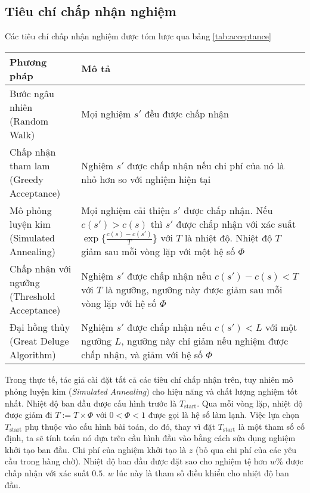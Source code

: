 \subsection{Tiêu chí chấp nhận nghiệm}

Các tiêu chí chấp nhận nghiệm được tóm lược qua bảng \ref{tab:acceptance}

\begin{table}[caption={Tiêu chí chấp nhận nghiệm}, label=tab:acceptance]
  \begin{tabularx}{\textwidth}{|l|X|}
    \hline
    Phương pháp & Mô tả \\ \hline
    \makecell[l]{Bước ngâu nhiên \\ (Random Walk)} & Mọi nghiệm $s'$ đều được chấp nhận \\ \hline
    \makecell[l]{Chấp nhận tham lam \\ (Greedy Acceptance)} & Nghiệm $s'$ được chấp nhận nếu chi phí của nó là nhỏ hơn so với nghiệm hiện tại \\ \hline
    \makecell[l]{Mô phỏng luyện kim \\ (Simulated Annealing)} & Mọi nghiệm cải thiện $s'$ được chấp nhận. Nếu $c(s') > c(s)$ thì $s'$ được chấp nhận với xác suất $\exp \{ \frac{c(s) - c(s')}{T} \}$ với $T$ là nhiệt độ. Nhiệt độ $T$ giảm sau mỗi vòng lặp với một hệ số $\Phi$ \\ \hline
    \makecell[l]{Chấp nhận với ngưỡng \\ (Threshold Acceptance)} & Nghiệm $s'$ được chấp nhận nếu $c(s') - c(s) < T$ với $T$ là ngưỡng, ngưỡng này được giảm sau mỗi vòng lặp với hệ số $\Phi$ \\ \hline
    \makecell[l]{Đại hồng thủy \\ (Great Deluge Algorithm)} & Nghiệm $s'$ được chấp nhận nếu $c(s') < L$ với một ngưỡng $L$, ngưỡng này chỉ giảm nếu nghiệm được chấp nhận, và giảm với hệ số $\Phi$ \\ \hline
    \end{tabularx}
\end{table}

Trong thực tế, tác giả cài đặt tất cả các tiêu chí chấp nhận trên, tuy nhiên mô phỏng luyện kim (\textit{Simulated Annealing}) cho hiệu năng và chất lượng nghiệm tốt nhất. Nhiệt độ ban đầu được cấu hình trước là $T_{\text{start}}$. Qua mỗi vòng lặp, nhiệt độ được giảm đi $T := T \times \Phi$ với $0 < \Phi < 1$ được gọi là hệ số làm lạnh. Việc lựa chọn $T_{\text{start}}$ phụ thuộc vào cấu hình bài toán, do đó, thay vì đặt $T_{\text{start}}$ là một tham số cố định, ta sẽ tính toán nó dựa trên cầu hình đầu vào bằng cách sửa dụng nghiệm khởi tạo ban đầu. Chi phí của nghiệm khởi tạo là $z$ (bỏ qua chi phí của các yêu cầu trong hàng chờ). Nhiệt độ ban đầu được đặt sao cho nghiệm tệ hơn $w\%$ được chấp nhận với xác suất $0.5$. $w$ lúc này là tham số điều khiển cho nhiệt độ ban đầu. 